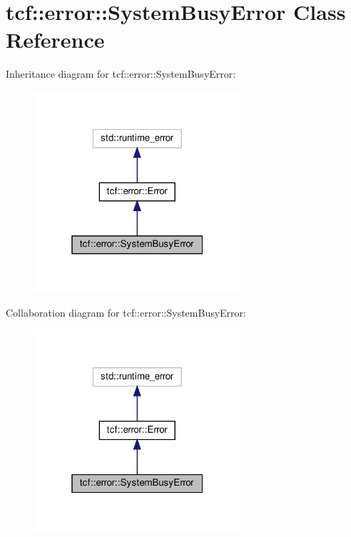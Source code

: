 \hypertarget{classtcf_1_1error_1_1SystemBusyError}{}\section{tcf\+:\+:error\+:\+:System\+Busy\+Error Class Reference}
\label{classtcf_1_1error_1_1SystemBusyError}


Inheritance diagram for tcf\+:\+:error\+:\+:System\+Busy\+Error\+:
\nopagebreak
\begin{figure}[H]
\begin{center}
\leavevmode
\includegraphics[width=217pt]{classtcf_1_1error_1_1SystemBusyError__inherit__graph}
\end{center}
\end{figure}


Collaboration diagram for tcf\+:\+:error\+:\+:System\+Busy\+Error\+:
\nopagebreak
\begin{figure}[H]
\begin{center}
\leavevmode
\includegraphics[width=217pt]{classtcf_1_1error_1_1SystemBusyError__coll__graph}
\end{center}
\end{figure}
